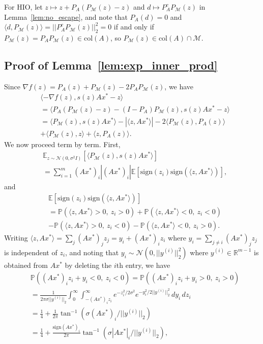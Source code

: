 \documentclass[journal]{IEEEtran}
\theoremstyle{definition}
\theoremstyle{remark}
\theoremstyle{definition}
\theoremstyle{problem}
\theoremstyle{definition}
\newcommand{\col}{\text{col}}
\newcommand{\sign}{\text{sign}}
\newcommand{\atan}{\tan^{-1}}
\newcommand{\RR}{\mathbb{R} }
\newcommand{\MM}{\mathcal{M}}
\newcommand{\PP}{\mathbb{P}}
\newcommand{\EE}{\mathbb{E}}
\begin{document}
For HIO, let $z\mapsto z + P_A(P_{\MM}(z)-z)$ and $d\mapsto P_A^cP_{\MM}(z)$ in Lemma~\ref{lem:no_escape}, and note that $P_A(d)=0$ and $\langle d,P_{\MM}(z)\rangle = ||P_A^cP_{\MM}(z)||_2^2 = 0$ if and only if $P_{\MM}(z)=P_AP_{\MM}(z)\in\col(A)$, so $P_{\MM}(z)\in\col(A)\cap\MM$.

\subsection{Proof of Lemma~\ref{lem:exp_inner_prod}}\label{sec:pf_exp_inner_prod}
Since $\nabla f(z) = P_A(z) + P_{\MM}(z) - 2P_AP_{\MM}(z)$, we have
\[\begin{aligned} &\langle -\nabla f(z), s(z)Ax^* - z\rangle \\&= \langle P_A(P_{\MM}(z)-z) - (I-P_A)P_{\MM}(z), s(z)Ax^*-z\rangle
\\ &= \langle P_{\MM}(z), s(z)Ax^*\rangle - |\langle z, Ax^*\rangle| -2\langle P_{\MM}(z), P_A(z)\rangle \\&+ \langle P_{\MM}(z), z\rangle + \langle z, P_A(z)\rangle. \end{aligned}\]
We now proceed term by term. First,
\[\begin{aligned} &\EE_{z\sim \mathcal{N}(0,\sigma^2I)}\left[\langle P_{\MM}(z), s(z)Ax^*\rangle\right] \\ &= \sum_{i=1}^m(Ax^*)_i|(Ax^*)_i|\EE[\sign(z_i)\sign(\langle z,Ax^*\rangle)], \end{aligned}\]
and
\[\begin{aligned}&\EE[\sign(z_i)\sign(\langle z,Ax^*\rangle)]\\
&= \PP(\langle z,Ax^*\rangle > 0,\ z_i>0) + \PP(\langle z,Ax^*\rangle < 0,\ z_i<0)\\
& - \PP(\langle z,Ax^*\rangle > 0,\ z_i<0) - \PP(\langle z,Ax^*\rangle < 0,\ z_i>0).\end{aligned}\]
Writing $\langle z,Ax^*\rangle = \sum_j(Ax^*)_jz_j = y_i + (Ax^*)_iz_i$ where $y_i = \sum_{j\neq i}(Ax^*)_jz_j$ is independent of $z_i$, and noting that $y_i\sim \mathcal{N}(0, ||y^{(i)}||_2^2)$ where $y^{(i)}\in\RR^{m-1}$ is obtained from $Ax^*$ by deleting the $i$th entry, we have
\[\begin{aligned} &\PP((Ax^*)_iz_i + y_i < 0,\ z_i < 0) = \PP((Ax^*)_iz_i + y_i > 0,\ z_i > 0)\\
&= \frac{1}{2\pi\sigma||y^{(i)}||_2}\int_0^{\infty}\int_{-(Ax^*)_iz_i}^{\infty}e^{-z_i^2/2\sigma^2}e^{-y_i^2/2||y^{(i)}||_2^2}\, dy_i\, dz_i\\
&= \frac{1}{4} + \frac{1}{2\pi}\atan(\sigma(Ax^*)_i/||y^{(i)}||_2)  \\&=\frac{1}{4} + \frac{\sign(Ax^*)_i}{2\pi}\atan(\sigma|Ax^*|_i/||y^{(i)}||_2),\end{aligned}\]
\end{document}

